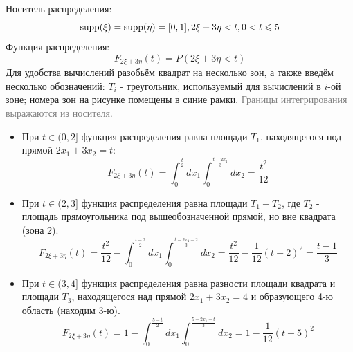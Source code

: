 \begin{exmp}
\begin{enumerate}
		Носитель распределения:
		\[ \operatorname{supp} (\xi) = \operatorname{supp} (\eta) = [0,1], 2\xi + 3 \eta < t, 0 < t \leqslant 5 \]
		Функция распределения:
		\[ F_{2 \xi + 3 \eta} (t) = P(2 \xi + 3 \eta < t) \]
		Для удобства вычислений разобьём квадрат на несколько зон, а также введём несколько обозначений: $T_i$ - треугольник, используемый для вычислений в $i$-ой зоне; номера зон на рисунке помещены в синие рамки. \textcolor{Grey}{Границы интегрирования выражаются из носителя.}
		\begin{itemize}
			\item При $t \in (0, 2]$ функция распределения равна площади $T_1$, находящегося под прямой $2x_1+3x_2=t$:
			\[ F_{2\xi + 3\eta} (t) = \int_{0}^{\frac{t}{2}} dx_1 \int_{0}^{\frac{t-2x_1}{3}}dx_2 = \frac{t^2}{12} \]
			\item При $t \in (2, 3]$ функция распределения равна площади $T_1 - T_2$, где $T_2$ - площадь прямоугольника под вышеобозначенной прямой, но вне квадрата (зона 2).
			\[ F_{2\xi + 3\eta} (t) = \frac{t^2}{12} - \int_{0}^{\frac{t-2}{2}}dx_1 \int_{0}^{\frac{t-2x_1-2}{3}} dx_2 = \frac{t^2}{12} - \frac{1}{12} (t - 2)^2 = \frac{t-1}{3} \]
			\item При $t \in (3, 4]$ функция распределения равна разности площади квадрата и площади $T_3$, находящегося над прямой $2x_1 + 3x_2 = 4$ и образующего 4-ю область (находим 3-ю).
			\[ F_{2\xi + 3\eta} (t) = 1 - \int_{0}^{\frac{5-t}{2}}dx_1 \int_{0}^{\frac{5-2x_1-t}{3}} dx_2 = 1 - \frac{1}{12} (t - 5)^2 \]
		\end{itemize}
		\begin{figure}[H]

\end{figure}
\end{enumerate}
\end{exmp}
